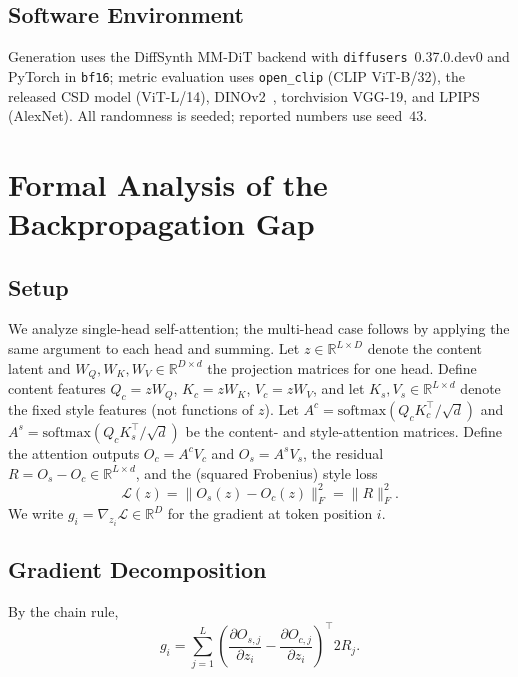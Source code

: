 \subsection{Software Environment}
\label{app:repro:env}
Generation uses the DiffSynth MM-DiT backend with \texttt{diffusers}~0.37.0.dev0
and PyTorch in \texttt{bf16}; metric evaluation uses \texttt{open\_clip}
(CLIP ViT-B/32), the released CSD model (ViT-L/14), DINOv2~\cite{oquab2024dinov2},
torchvision VGG-19, and LPIPS (AlexNet). All randomness is seeded; reported
numbers use seed~$43$.

\section{Formal Analysis of the Backpropagation Gap}
\label{app:jacobian}

\subsection{Setup}

We analyze single-head self-attention; the multi-head case follows by applying
the same argument to each head and summing.
Let $z \in \mathbb{R}^{L \times D}$ denote the content latent and
$W_Q, W_K, W_V \in \mathbb{R}^{D \times d}$ the projection matrices for one
head.
Define content features $Q_c = zW_Q$, $K_c = zW_K$, $V_c = zW_V$,
and let $K_s, V_s \in \mathbb{R}^{L \times d}$ denote the fixed style features
(not functions of $z$).
Let $A^c = \mathrm{softmax}(Q_c K_c^\top / \sqrt{d})$ and
$A^s = \mathrm{softmax}(Q_c K_s^\top / \sqrt{d})$ be the content- and
style-attention matrices.
Define the attention outputs $O_c = A^c V_c$ and $O_s = A^s V_s$, the residual
$R = O_s - O_c \in \mathbb{R}^{L \times d}$, and the (squared Frobenius)
style loss
\begin{equation}
  \mathcal{L}(z) = \|O_s(z) - O_c(z)\|_F^2 = \|R\|_F^2.
  \label{eq:supp_loss}
\end{equation}
We write $g_i = \nabla_{z_i}\mathcal{L} \in \mathbb{R}^D$ for the gradient at
token position $i$.

\subsection{Gradient Decomposition}

By the chain rule,
\begin{equation}
  g_i
  = \sum_{j=1}^{L} \left(
      \frac{\partial O_{s,j}}{\partial z_i}
    - \frac{\partial O_{c,j}}{\partial z_i}
    \right)^\top\! 2R_j.
  \label{eq:supp_chain}
\end{equation}


